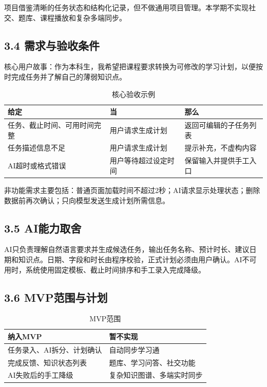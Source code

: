 \documentclass[UTF8,12pt,a4paper]{ctexart}
\begin{document}
项目借鉴清晰的任务状态和结构化记录，但不做通用项目管理。本学期不实现社交、题库、课程播放和复杂多端同步。

\subsection*{3.4 需求与验收条件}

核心用户故事：作为本科生，我希望把课程要求转换为可修改的学习计划，以便按时完成任务并了解自己的薄弱知识点。

\begin{table}[htbp]
\centering
\caption{核心验收示例}
\begin{tabular}{p{4.0cm}p{4.4cm}p{4.6cm}}
\toprule
给定 & 当 & 那么 \\
\midrule
任务、截止时间、可用时间完整 & 用户请求生成计划 & 返回可编辑的子任务列表 \\
任务描述信息不足 & 用户请求生成计划 & 提示补充，不虚构内容 \\
AI超时或格式错误 & 用户等待超过设定时间 & 保留输入并提供手工入口 \\
\bottomrule
\end{tabular}
\end{table}

非功能需求主要包括：普通页面加载时间不超过2秒；AI请求显示处理状态；删除数据前再次确认；只向模型发送生成计划所需信息。

\subsection*{3.5 AI能力取舍}

AI只负责理解自然语言要求并生成候选任务，输出任务名称、预计时长、建议日期和知识点。日期、字段和时长由程序校验，正式计划必须由用户确认。AI不可用时，系统使用固定模板、截止时间排序和手工录入完成降级。

\subsection*{3.6 MVP范围与计划}

\begin{table}[htbp]
\centering
\caption{MVP范围}
\begin{tabular}{p{6.5cm}p{6.5cm}}
\toprule
纳入MVP & 暂不实现 \\
\midrule
任务录入、AI拆分、计划确认 & 自动同步学习通 \\
完成反馈、知识状态列表 & 题库、学习问答、社交功能 \\
AI失败后的手工降级 & 复杂知识图谱、多端实时同步 \\
\bottomrule
\end{tabular}
\end{table}
\end{document}
